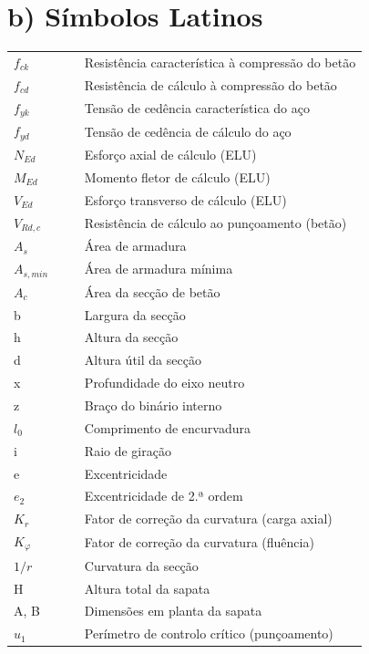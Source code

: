 \section*{b) Símbolos Latinos}
    \begin{flushleft}
        \begin{tabular}{l p{0.8\linewidth}}
        $f_{ck}$ & Resistência característica à compressão do betão \\
        $f_{cd}$ & Resistência de cálculo à compressão do betão \\
        $f_{yk}$ & Tensão de cedência característica do aço \\
        $f_{yd}$ & Tensão de cedência de cálculo do aço \\
        $N_{Ed}$ & Esforço axial de cálculo (ELU) \\
        $M_{Ed}$ & Momento fletor de cálculo (ELU) \\
        $V_{Ed}$ & Esforço transverso de cálculo (ELU) \\
        $V_{Rd,c}$ & Resistência de cálculo ao punçoamento (betão) \\
        $A_{s}$ & Área de armadura \\
        $A_{s,min}$ & Área de armadura mínima \\
        $A_{c}$ & Área da secção de betão \\
        b & Largura da secção \\
        h & Altura da secção \\
        d & Altura útil da secção \\
        x & Profundidade do eixo neutro \\
        z & Braço do binário interno \\
        $l_{0}$ & Comprimento de encurvadura \\
        i & Raio de giração \\
        e & Excentricidade \\
        $e_2$ & Excentricidade de 2.ª ordem \\
        $K_r$ & Fator de correção da curvatura (carga axial) \\
        $K_{\varphi}$ & Fator de correção da curvatura (fluência) \\
        $1/r$ & Curvatura da secção \\
        H & Altura total da sapata \\
        A, B & Dimensões em planta da sapata \\
        $u_1$ & Perímetro de controlo crítico (punçoamento) \\
        \end{tabular}
    \end{flushleft}